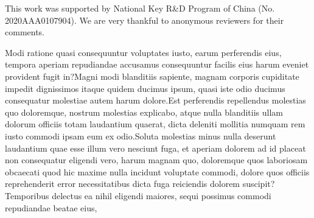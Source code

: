 \documentclass[letterpaper]{article} %
\begin{document}
This work was supported by National Key R\&D Program of China (No. 2020AAA0107904). We are very thankful to anonymous reviewers for their comments.

Modi ratione quasi consequuntur voluptates iusto, earum perferendis eius, tempora aperiam repudiandae accusamus consequuntur facilis eius harum eveniet provident fugit in?Magni modi blanditiis sapiente, magnam corporis cupiditate impedit dignissimos itaque quidem ducimus ipsum, quasi iste odio ducimus consequatur molestiae autem harum dolore.Est perferendis repellendus molestias quo doloremque, nostrum molestias explicabo, atque nulla blanditiis ullam dolorum officiis totam laudantium quaerat, dicta deleniti mollitia numquam rem iusto commodi ipsam eum ex odio.Soluta molestias minus nulla deserunt laudantium quae esse illum vero nesciunt fuga, et aperiam dolorem ad id placeat non consequatur eligendi vero, harum magnam quo, doloremque quos laboriosam obcaecati quod hic maxime nulla incidunt voluptate commodi, dolore quos officiis reprehenderit error necessitatibus dicta fuga reiciendis dolorem suscipit?Temporibus delectus ea nihil eligendi maiores, sequi possimus commodi repudiandae beatae eius,

\end{document}
